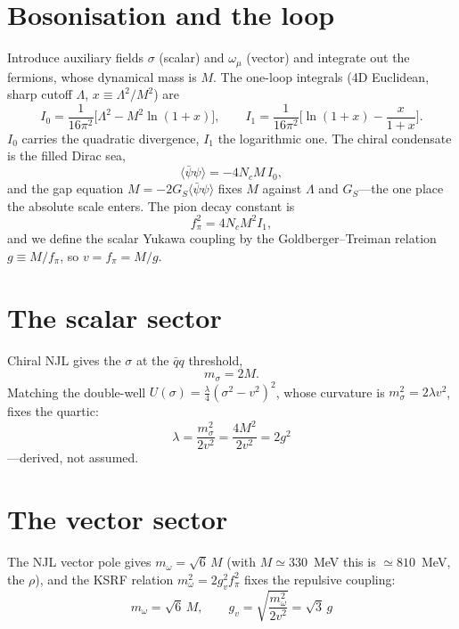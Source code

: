 \section{Bosonisation and the loop}
Introduce auxiliary fields $\sigma$ (scalar) and $\omega_\mu$ (vector) and integrate out the
fermions, whose dynamical mass is $M$. The one-loop integrals (4D Euclidean, sharp cutoff
$\Lambda$, $x\equiv\Lambda^2/M^2$) are
\begin{equation}
  I_0=\frac{1}{16\pi^2}\Big[\Lambda^2-M^2\ln(1+x)\Big],\qquad
  I_1=\frac{1}{16\pi^2}\Big[\ln(1+x)-\frac{x}{1+x}\Big].
  \label{eq:loops}
\end{equation}
$I_0$ carries the quadratic divergence, $I_1$ the logarithmic one. The chiral condensate is the
filled Dirac sea,
\begin{equation}
  \langle\bar\psi\psi\rangle = -4 N_c M\,I_0 ,
  \label{eq:condensate}
\end{equation}
and the gap equation $M=-2G_S\langle\bar\psi\psi\rangle$ fixes $M$ against $\Lambda$ and $G_S$---the
one place the absolute scale enters. The pion decay constant is
\begin{equation}
  f_\pi^2 = 4 N_c M^2 I_1 ,
  \label{eq:fpi}
\end{equation}
and we define the scalar Yukawa coupling by the Goldberger--Treiman relation $g\equiv M/f_\pi$, so
$v=f_\pi=M/g$.

\section{The scalar sector}
Chiral NJL gives the $\sigma$ at the $\bar q q$ threshold,
\begin{equation}
  m_\sigma = 2M .
  \label{eq:msigma}
\end{equation}
Matching the double-well $U(\sigma)=\tfrac{\lambda}{4}(\sigma^2-v^2)^2$, whose curvature is
$m_\sigma^2=2\lambda v^2$, fixes the quartic:
\begin{equation}
  \boxed{\ \lambda=\frac{m_\sigma^2}{2v^2}=\frac{4M^2}{2v^2}=2g^2\ }
  \label{eq:lambda}
\end{equation}
---derived, not assumed.

\section{The vector sector}
The NJL vector pole gives $m_\omega=\sqrt6\,M$ (with $M\simeq330$~MeV this is $\simeq810$~MeV, the
$\rho$), and the KSRF relation $m_\omega^2=2 g_v^2 f_\pi^2$ fixes the repulsive coupling:
\begin{equation}
  \boxed{\ m_\omega=\sqrt6\,M,\qquad g_v=\sqrt{\frac{m_\omega^2}{2v^2}}=\sqrt3\,g\ }
  \label{eq:vector}
\end{equation}

